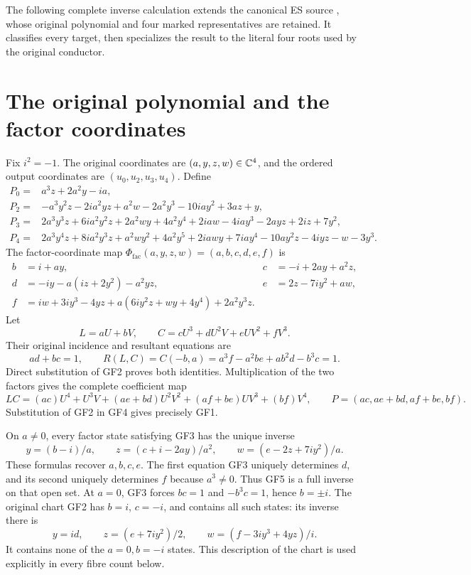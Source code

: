 \providecommand{\cP}{\mathcal P}
The following complete inverse calculation extends the canonical ES source
\cite{fullfable:ES488}, whose original polynomial and four marked representatives
are retained. It classifies every target, then specializes the result
to the literal four roots used by the original conductor.

\section{The original polynomial and the factor coordinates}
Fix $i^2=-1$. The original coordinates are $(a,y,z,w)\in\mathbb C^4$,
and the ordered output coordinates are $(u_0,u_2,u_3,u_4)$. Define
\begin{align}
 P_0={}&a^3z+2a^2y-ia,\nonumber\\
 P_2={}&-a^3y^2z-2ia^2yz+a^2w-2a^2y^3-10iay^2+3az+y,\nonumber\\
 P_3={}&2a^3y^3z+6ia^2y^2z+2a^2wy+4a^2y^4+2iaw
       -4iay^3-2ayz+2iz+7y^2,\nonumber\\
 P_4={}&2a^3y^4z+8ia^2y^3z+a^2wy^2+4a^2y^5+2iawy
       +7iay^4-10ay^2z-4iyz-w-3y^3.
 \tag{GF1}
\end{align}
The factor-coordinate map $\Phi_{\mathrm{fac}}(a,y,z,w)=(a,b,c,d,e,f)$ is
\begin{align}
 b&=i+ay,&c&=-i+2ay+a^2z,\nonumber\\
 d&=-iy-a(iz+2y^2)-a^2yz,&e&=2z-7iy^2+aw,\nonumber\\
 f&=iw+3iy^3-4yz+a(6iy^2z+wy+4y^4)+2a^2y^3z.
 &&\tag{GF2}
\end{align}
Let
\[
 L=aU+bV,\qquad C=cU^3+dU^2V+eUV^2+fV^3.
\]
Their original incidence and resultant equations are
\begin{equation}
 ad+bc=1,\qquad
 R(L,C)=C(-b,a)=a^3f-a^2be+ab^2d-b^3c=1.\tag{GF3}
\end{equation}
Direct substitution of GF2 proves both identities. Multiplication
of the two factors gives the complete coefficient map
\begin{equation}
 LC=(ac)U^4+U^3V+(ae+bd)U^2V^2+(af+be)UV^3+(bf)V^4,
 \qquad P=(ac,ae+bd,af+be,bf).\tag{GF4}
\end{equation}
Substitution of GF2 in GF4 gives precisely GF1.

On $a\ne0$, every factor state satisfying GF3 has the unique inverse
\begin{equation}
 y=(b-i)/a,\qquad z=(c+i-2ay)/a^2,\qquad
 w=(e-2z+7iy^2)/a.\tag{GF5}
\end{equation}
These formulas recover $a,b,c,e$. The first equation GF3 uniquely
determines $d$, and its second uniquely determines $f$ because
$a^3\ne0$. Thus GF5 is a full inverse on that open set.
At $a=0$, GF3 forces $bc=1$ and $-b^3c=1$, hence $b=\pm i$.
The original chart GF2 has $b=i$, $c=-i$, and contains all such
states: its inverse there is
\[
 y=id,\qquad z=(e+7iy^2)/2,\qquad
 w=(f-3iy^3+4yz)/i.
\]
It contains none of the $a=0,b=-i$ states. This description of the
chart is used explicitly in every fibre count below.

